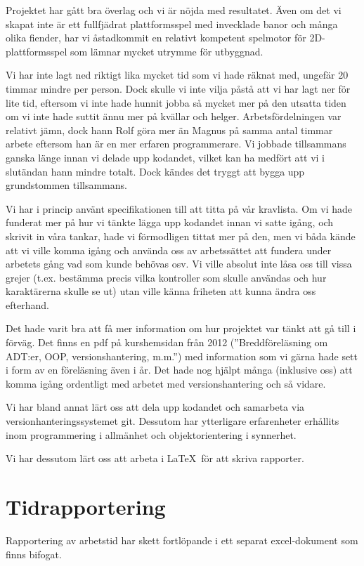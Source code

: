 \documentclass{scrartcl}
\begin{document}
Projektet har gått bra överlag och vi är nöjda med resultatet. Även om det vi skapat inte är ett fullfjädrat plattformsspel med invecklade banor och många olika fiender, har vi åstadkommit en relativt kompetent spelmotor för 2D-plattformsspel som lämnar mycket utrymme för utbyggnad.

Vi har inte lagt ned riktigt lika mycket tid som vi hade räknat med, ungefär 20 timmar mindre per person. Dock skulle vi inte vilja påstå att vi har lagt ner för lite tid, eftersom vi inte hade hunnit jobba så mycket mer på den utsatta tiden om vi inte hade suttit ännu mer på kvällar och helger. Arbetsfördelningen var relativt jämn, dock hann Rolf göra mer än Magnus på samma antal timmar arbete eftersom han är en mer erfaren programmerare. Vi jobbade tillsammans ganska länge innan vi delade upp kodandet, vilket kan ha medfört att vi i slutändan hann mindre totalt. Dock kändes det tryggt att bygga upp grundstommen tillsammans. 

Vi har i princip använt specifikationen till att titta på vår kravlista. Om vi hade funderat mer på hur vi tänkte lägga upp kodandet innan vi satte igång, och skrivit in våra tankar, hade vi förmodligen tittat mer på den, men vi båda kände att vi ville komma igång och använda oss av arbetssättet att fundera under arbetets gång vad som kunde behövas osv. Vi ville absolut inte låsa oss till vissa grejer (t.ex. bestämma precis vilka kontroller som skulle användas och hur karaktärerna skulle se ut) utan ville känna friheten att kunna ändra oss efterhand. 

Det hade varit bra att få mer information om hur projektet var tänkt att gå till i förväg. Det finns en pdf på kurshemsidan från 2012 (''Breddföreläsning om ADT:er, OOP, versionshantering, m.m.'') med information som vi gärna hade sett i form av en föreläsning även i år. Det hade nog hjälpt många (inklusive oss) att komma igång ordentligt med arbetet med versionshantering och så vidare.

Vi har bland annat lärt oss att dela upp kodandet och samarbeta via versionhanteringssystemet git. Dessutom har ytterligare erfarenheter erhållits inom programmering i allmänhet och objektorientering i synnerhet. 

Vi har dessutom lärt oss att arbeta i \LaTeX\ för att skriva rapporter.

\section{Tidrapportering}
Rapportering av arbetstid har skett fortlöpande i ett separat excel-dokument som finns bifogat. 
\end{document}

